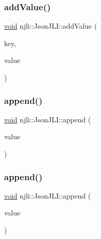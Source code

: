 \mbox{\label{classnjli_1_1_json_j_l_i_a83bf1f54b655a8ffcb44862665dab40b}} 
\subsubsection{\texorpdfstring{add\+Value()}{addValue()}\hspace{0.1cm}{\footnotesize\ttfamily [2/2]}}
{\footnotesize\ttfamily \mbox{\hyperlink{_thread_8h_af1e856da2e658414cb2456cb6f7ebc66}{void}} njli\+::\+Json\+J\+L\+I\+::add\+Value (\begin{DoxyParamCaption}\item[{const std\+::string \&}]{key,  }\item[{const \mbox{\hyperlink{classnjli_1_1_json_j_l_i}{Json\+J\+LI}} \&}]{value }\end{DoxyParamCaption})}

\mbox{\label{classnjli_1_1_json_j_l_i_a7487f2f83659dfb1a3f1bf75ed9f6e47}} 
\subsubsection{\texorpdfstring{append()}{append()}\hspace{0.1cm}{\footnotesize\ttfamily [1/2]}}
{\footnotesize\ttfamily \mbox{\hyperlink{_thread_8h_af1e856da2e658414cb2456cb6f7ebc66}{void}} njli\+::\+Json\+J\+L\+I\+::append (\begin{DoxyParamCaption}\item[{const std\+::string \&}]{value }\end{DoxyParamCaption})}

\mbox{\label{classnjli_1_1_json_j_l_i_a39309cbcc85b3fc8afc9f16983f71db4}} 
\subsubsection{\texorpdfstring{append()}{append()}\hspace{0.1cm}{\footnotesize\ttfamily [2/2]}}
{\footnotesize\ttfamily \mbox{\hyperlink{_thread_8h_af1e856da2e658414cb2456cb6f7ebc66}{void}} njli\+::\+Json\+J\+L\+I\+::append (\begin{DoxyParamCaption}\item[{const \mbox{\hyperlink{classnjli_1_1_json_j_l_i}{Json\+J\+LI}} \&}]{value }\end{DoxyParamCaption})}

